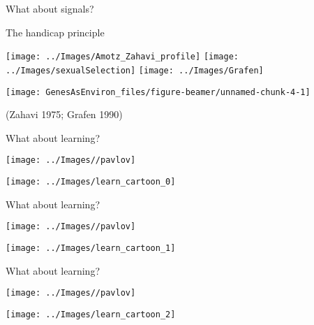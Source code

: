 \documentclass[
  ignorenonframetext,
]{beamer}
\begin{document}
\begin{frame}{What about signals?}
\protect\hypertarget{what-about-signals}{}

\begin{block}{The handicap principle}

\begin{center}\texttt{[image: ../Images/Amotz\_Zahavi\_profile]} \texttt{[image: ../Images/sexualSelection]} \texttt{[image: ../Images/Grafen]} \end{center}

\begin{center}\texttt{[image: GenesAsEnviron\_files/figure-beamer/unnamed-chunk-4-1]} \end{center}

(Zahavi 1975; Grafen 1990)

\end{block}

\end{frame}

\begin{frame}{What about learning?}
\protect\hypertarget{what-about-learning}{}

\begin{center}\texttt{[image: ../Images//pavlov]} \end{center}

\begin{center}\texttt{[image: ../Images/learn\_cartoon\_0]} \end{center}

\end{frame}

\begin{frame}{What about learning?}
\protect\hypertarget{what-about-learning-1}{}

\begin{center}\texttt{[image: ../Images//pavlov]} \end{center}

\begin{center}\texttt{[image: ../Images/learn\_cartoon\_1]} \end{center}

\end{frame}

\begin{frame}{What about learning?}
\protect\hypertarget{what-about-learning-2}{}

\begin{center}\texttt{[image: ../Images//pavlov]} \end{center}

\begin{center}\texttt{[image: ../Images/learn\_cartoon\_2]} \end{center}

\end{frame}
\end{document}
